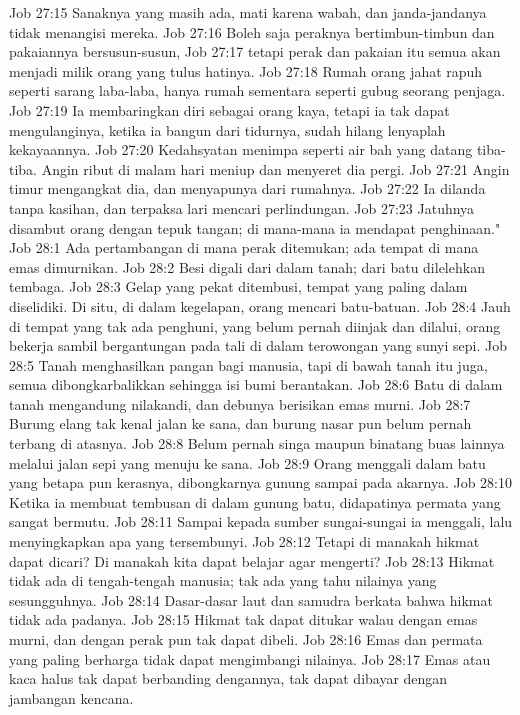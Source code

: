 Job 27:15  Sanaknya yang masih ada, mati karena wabah, dan janda-jandanya tidak menangisi mereka.
Job 27:16  Boleh saja peraknya bertimbun-timbun dan pakaiannya bersusun-susun,
Job 27:17  tetapi perak dan pakaian itu semua akan menjadi milik orang yang tulus hatinya.
Job 27:18  Rumah orang jahat rapuh seperti sarang laba-laba, hanya rumah sementara seperti gubug seorang penjaga.
Job 27:19  Ia membaringkan diri sebagai orang kaya, tetapi ia tak dapat mengulanginya, ketika ia bangun dari tidurnya, sudah hilang lenyaplah kekayaannya.
Job 27:20  Kedahsyatan menimpa seperti air bah yang datang tiba-tiba. Angin ribut di malam hari meniup dan menyeret dia pergi.
Job 27:21  Angin timur mengangkat dia, dan menyapunya dari rumahnya.
Job 27:22  Ia dilanda tanpa kasihan, dan terpaksa lari mencari perlindungan.
Job 27:23  Jatuhnya disambut orang dengan tepuk tangan; di mana-mana ia mendapat penghinaan."
Job 28:1  Ada pertambangan di mana perak ditemukan; ada tempat di mana emas dimurnikan.
Job 28:2  Besi digali dari dalam tanah; dari batu dilelehkan tembaga.
Job 28:3  Gelap yang pekat ditembusi, tempat yang paling dalam diselidiki. Di situ, di dalam kegelapan, orang mencari batu-batuan.
Job 28:4  Jauh di tempat yang tak ada penghuni, yang belum pernah diinjak dan dilalui, orang bekerja sambil bergantungan pada tali di dalam terowongan yang sunyi sepi.
Job 28:5  Tanah menghasilkan pangan bagi manusia, tapi di bawah tanah itu juga, semua dibongkarbalikkan sehingga isi bumi berantakan.
Job 28:6  Batu di dalam tanah mengandung nilakandi, dan debunya berisikan emas murni.
Job 28:7  Burung elang tak kenal jalan ke sana, dan burung nasar pun belum pernah terbang di atasnya.
Job 28:8  Belum pernah singa maupun binatang buas lainnya melalui jalan sepi yang menuju ke sana.
Job 28:9  Orang menggali dalam batu yang betapa pun kerasnya, dibongkarnya gunung sampai pada akarnya.
Job 28:10  Ketika ia membuat tembusan di dalam gunung batu, didapatinya permata yang sangat bermutu.
Job 28:11  Sampai kepada sumber sungai-sungai ia menggali, lalu menyingkapkan apa yang tersembunyi.
Job 28:12  Tetapi di manakah hikmat dapat dicari? Di manakah kita dapat belajar agar mengerti?
Job 28:13  Hikmat tidak ada di tengah-tengah manusia; tak ada yang tahu nilainya yang sesungguhnya.
Job 28:14  Dasar-dasar laut dan samudra berkata bahwa hikmat tidak ada padanya.
Job 28:15  Hikmat tak dapat ditukar walau dengan emas murni, dan dengan perak pun tak dapat dibeli.
Job 28:16  Emas dan permata yang paling berharga tidak dapat mengimbangi nilainya.
Job 28:17  Emas atau kaca halus tak dapat berbanding dengannya, tak dapat dibayar dengan jambangan kencana.

